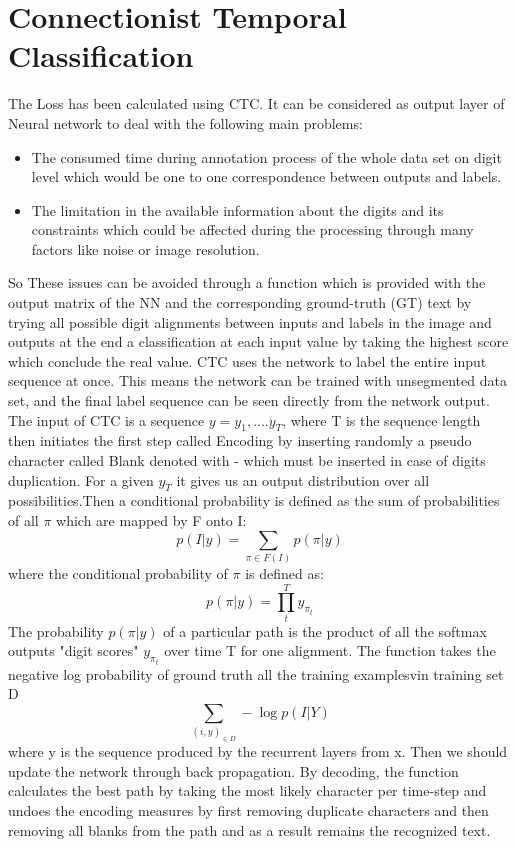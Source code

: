 \section{Connectionist Temporal Classification}

The Loss has been calculated using CTC. It can be considered as output layer of Neural network to deal with the following main problems:
\begin{itemize}
\item The consumed time during annotation process of the whole data set on digit level which would be one to one correspondence between outputs and labels.
\item The limitation in the available information about the digits and its constraints which could be affected during the processing through many factors like noise or image resolution.
\end{itemize}
So These issues can be avoided through a function which is provided with the output matrix of the NN and the corresponding ground-truth (GT) text by trying all possible digit alignments between inputs and labels in the image and outputs at the end a classification at each input value by taking the highest score which conclude the real value. CTC uses the network to label the entire input sequence at once. This means the network can be trained with unsegmented data set, and the final label sequence can be seen directly from the network output. The input of CTC is a sequence $y=y_{1},....y_{T}$, where T is the sequence length then initiates the first step called Encoding by inserting randomly a pseudo character called Blank denoted with {-} which must be inserted in case of digits duplication. For a given $y_{T}$ it gives us an output distribution over all possibilities.Then a conditional probability is defined as the sum of probabilities of all $\pi$ which are mapped by F onto I:
\begin{equation}
p( I | y)=\sum_{\pi \in F(I)} p( \pi | y )
\label{eq3}
\end{equation}
where the conditional probability of $\pi$ is defined as: 
\begin{equation}
p( \pi | y ) =\prod_t^T y_{\pi_{t}}
\label{eq3}
\end{equation}
The probability $p( \pi | y )$ of a particular path is the product of all the softmax outputs "digit scores" $y_{\pi_{t}}$ over time T for one alignment. The function takes the negative log probability of ground truth all the training examplesvin training set D
\begin{equation}
\sum_{(i,y)_{\in D}} - \log  p( I | Y )
\label{eq3}
\end{equation}
where y is the sequence produced by the recurrent layers from x. Then we should update the network through back propagation. By decoding, the function calculates the best path by taking the most likely character per time-step and undoes the encoding measures by first removing duplicate characters and then removing all blanks from the path and as a result remains the recognized text.

